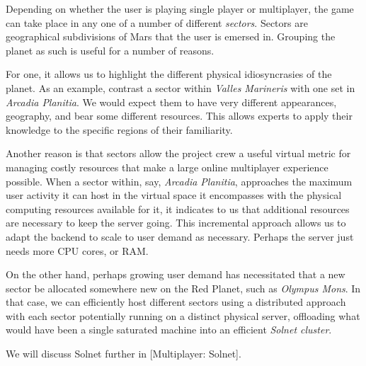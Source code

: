 

Depending on whether the user is playing single player or multiplayer, the game can take place in any one of a number of different {\it sectors}. Sectors are geographical subdivisions of Mars that the user is emersed in. Grouping the planet as such is useful for a number of reasons.

For one, it allows us to highlight the different physical idiosyncrasies of the planet. As an example, contrast a sector within {\it Valles Marineris} with one set in {\it Arcadia Planitia}. We would expect them to have very different appearances, geography, and bear some different resources. This allows experts to apply their knowledge to the specific regions of their familiarity.

Another reason is that sectors allow the project crew a useful virtual metric for managing costly resources that make a large online multiplayer experience possible. When a sector within, say, {\it Arcadia Planitia}, approaches the maximum user activity it can host in the virtual space it encompasses with the physical computing resources available for it, it indicates to us that additional resources are necessary to keep the server going. This incremental approach allows us to adapt the backend to scale to user demand as necessary. Perhaps the server just needs more CPU cores, or RAM. 

On the other hand, perhaps growing user demand has necessitated that a new sector be allocated somewhere new on the Red Planet, such as {\it Olympus Mons}. In that case, we can efficiently host different sectors using a distributed approach with each sector potentially running on a distinct physical server, offloading what would have been a single saturated machine into an efficient {\it Solnet cluster}. 

We will discuss Solnet further in [Multiplayer: Solnet].

